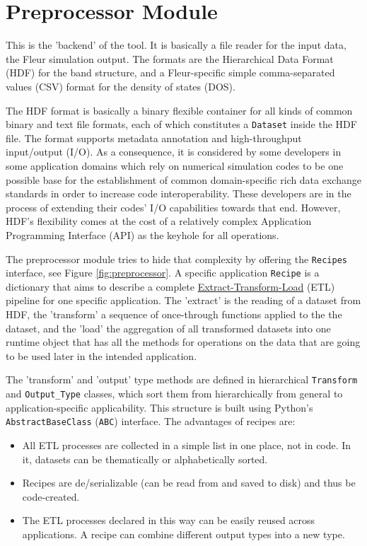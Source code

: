 \section{Preprocessor Module}
\label{sec:preprocessor-module}

This is the 'backend' of the tool. It is basically a file reader for the input
data, the Fleur simulation output. The formats are the Hierarchical Data Format
(HDF) \cite{hdf} for the band structure, and a Fleur-specific simple
comma-separated values (CSV) format for the density of states (DOS).

The HDF format is basically a binary flexible container for all kinds of common
binary and text file formats, each of which constitutes a \texttt{Dataset}
inside the HDF file. The format supports metadata annotation and high-throughput
input/output (I/O). As a consequence, it is considered by some developers in
some application domains which rely on numerical simulation codes to be one
possible base for the establishment of common domain-specific rich data exchange
standards in order to increase code interoperability. These developers are in
the process of extending their codes' I/O capabilities towards that end.
However, HDF's flexibility comes at the cost of a relatively complex Application
Programming Interface (API) as the keyhole for all operations.

The preprocessor module tries to hide that complexity by offering the
\texttt{Recipes} interface, see Figure \ref{fig:preprocessor}. A specific
application \texttt{Recipe} is a dictionary that aims to describe a complete
\href{https://en.wikipedia.org/wiki/Extract,_transform,_load}{Extract-Transform-Load}
(ETL) pipeline for one specific application. The 'extract' is the reading of a
dataset from HDF, the 'transform' a sequence of once-through functions applied
to the the dataset, and the 'load' the aggregation of all transformed datasets
into one runtime object that has all the methods for operations on the data that
are going to be used later in the intended application.

The 'transform' and 'output' type methods are defined in hierarchical
\texttt{Transform} and \texttt{Output\_Type} classes, which sort them from
hierarchically from general to application-specific applicability. This
structure is built using Python's \texttt{AbstractBaseClass} (\texttt{ABC})
interface. The advantages of recipes are:
\begin{itemize}
\item All ETL processes are collected in a simple list in one place, not in
    code. In it, datasets can be thematically or alphabetically sorted.
\item Recipes are de/serializable (can be read from and saved to disk) and thus be
    code-created.
\item The ETL processes declared in this way can be easily reused across
    applications. A recipe can combine different output types into a new type.
\end{itemize}


